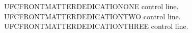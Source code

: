 UFCFRONTMATTERDEDICATIONONE control line.\\
UFCFRONTMATTERDEDICATIONTWO control line.\\
UFCFRONTMATTERDEDICATIONTHREE control line.
